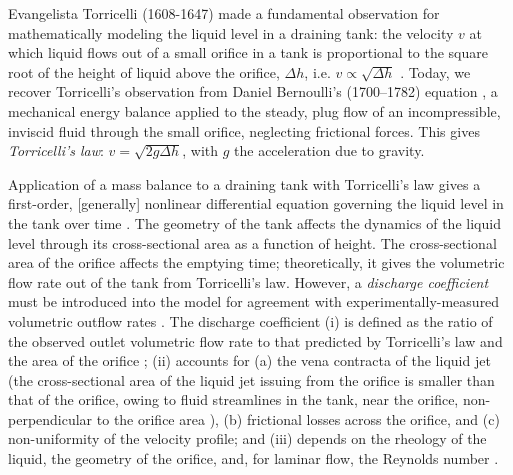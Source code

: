 \documentclass[openacc]{rsproca_new}%
\begin{document}

Evangelista Torricelli (1608-1647) made a fundamental observation for mathematically modeling the liquid level in a draining tank: the velocity $v$ at which liquid flows out of a small orifice in a tank is proportional to the square root of the height of liquid above the orifice, $\Delta h$, i.e. $v\propto \sqrt{\Delta h}$ \cite{mills1982newton}.
Today, we recover Torricelli's observation from Daniel Bernoulli's (1700–1782) equation \cite{welty2020fundamentals}, a mechanical energy balance applied to the steady, plug flow of an incompressible, inviscid fluid through the small orifice, neglecting frictional forces. This gives \emph{Torricelli's law}: $v=\sqrt{2 g \Delta h}$, with $g$ the acceleration due to gravity. \cite{d2021torricelli,teoman2022discharge}

Application of a mass balance to a draining tank with Torricelli's law gives a first-order, [generally] nonlinear differential equation governing the liquid level in the tank over time \cite{groetsch1993inverse,seborg2016process,debook}.
The geometry of the tank affects the dynamics of the liquid level through its cross-sectional area as a function of height.
The cross-sectional area of the orifice affects the emptying time; theoretically, it gives the volumetric flow rate out of the tank from Torricelli's law. 
However, a \emph{discharge coefficient} \cite{de2000pin,blasone2015discharge,wadhwa2021study,liu2008drainage} must be introduced into the model for agreement with experimentally-measured volumetric outflow rates \cite{farmer1992physical,driver1998torricelli,brady2009siphons,rother2024modelling,paldy1963apparatus,ivanov2014testing,williams2021vessel,pavesi2019investigating,planinvsivc2011holes,saleta2005experimental,lopac2015water,powell2012carrying}.
The discharge coefficient \cite{teoman2022discharge,hicks2014determining,blasone2015discharge,lienhard1984velocity,wadhwa2021study}
(i) is defined as the ratio of the observed outlet volumetric flow rate to that predicted by Torricelli's law and the area of the orifice \cite{hicks2014determining};
(ii) accounts for (a) the vena contracta of the liquid jet (the cross-sectional area of the liquid jet issuing from the orifice is smaller than that of the orifice, owing to fluid streamlines in the tank, near the orifice, non-perpendicular to the orifice area \cite{horsch2020simple}), (b) frictional losses across the orifice, and (c) non-uniformity of the velocity profile; and
(iii) depends on the rheology of the liquid, the geometry of the orifice, and, for laminar flow, the Reynolds number \cite{teoman2022discharge}. 
\end{document}
